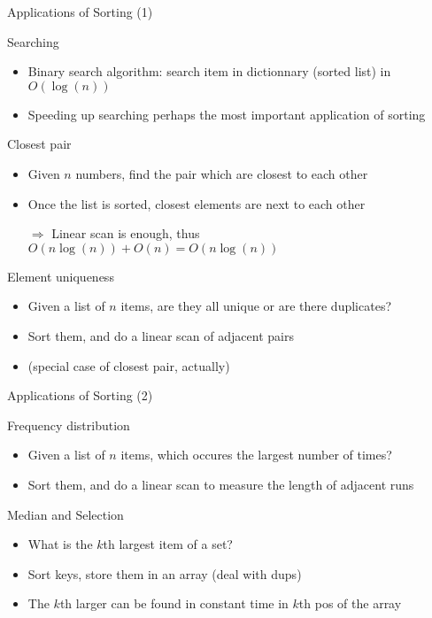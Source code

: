 \begin{frame}{Applications of Sorting (1)}
  \begin{block}{Searching}
    \begin{itemize}
    \item Binary search algorithm: search item in dictionnary (sorted list) in
      $O(\log(n))$
    \item Speeding up searching perhaps the most important application of
      sorting 
    \end{itemize}
  \end{block}

  \begin{block}{Closest pair}
    \begin{itemize}
    \item Given $n$ numbers, find the pair which are closest to each other
    \item Once the list is sorted, closest elements are next to each other
    \item[$\Rightarrow$] Linear scan is enough, thus
      $O(n\log(n))+O(n)=O(n\log(n))$ 
    \end{itemize}
  \end{block}

  \begin{block}{Element uniqueness}
    \begin{itemize}
    \item Given a list of $n$ items, are they all unique or are there
      duplicates? 
    \item Sort them, and do a linear scan of adjacent pairs
    \item (special case of closest pair, actually)
    \end{itemize}
  \end{block}
\end{frame}
\begin{frame}{Applications of Sorting (2)}
  \begin{block}{Frequency distribution}
    \begin{itemize}
    \item Given a list of $n$ items, which occures the largest number of times?
    \item Sort them, and do a linear scan to measure the length of adjacent runs
    \end{itemize}
  \end{block}
  \begin{block}{Median and Selection}
    \begin{itemize}
    \item What is the $k$th largest item of a set?
    \item Sort keys, store them in an array (deal with dups)
    \item The $k$th larger can be found in constant time in $k$th pos of the
      array 
    \end{itemize}
  \end{block}
\end{frame}
